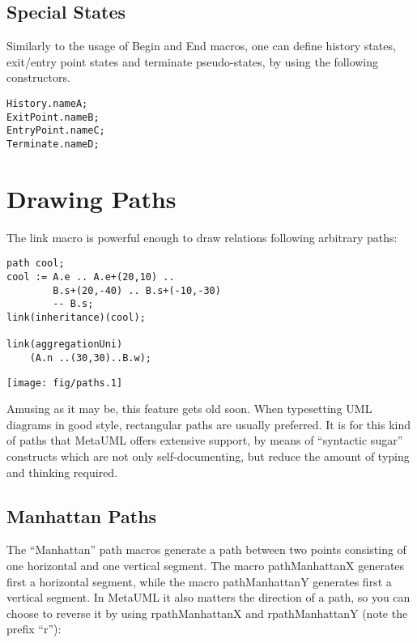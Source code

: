 \documentclass{article}
\newcommand{\code}{\ttfamily}
\begin{document}
\subsection{Special States}

Similarly to the usage of {\code Begin} and {\code End} macros, one can define history states,
exit/entry point states and terminate pseudo-states, by using the following constructors.

\begin{verbatim}
History.nameA;
ExitPoint.nameB;
EntryPoint.nameC;
Terminate.nameD;
\end{verbatim}

\section{Drawing Paths}

The {\code link} macro is powerful enough to draw relations following arbitrary paths:

\begin{multicols}{2}
\begin{verbatim}
path cool;
cool := A.e .. A.e+(20,10) ..
        B.s+(20,-40) .. B.s+(-10,-30)
        -- B.s;
link(inheritance)(cool);

link(aggregationUni)
    (A.n ..(30,30)..B.w);
\end{verbatim}
\columnbreak
\hspace{1cm}\texttt{[image: fig/paths.1]}
\end{multicols}

Amusing as it may be, this feature gets old soon. When typesetting UML diagrams in good style, rectangular paths are usually preferred. 
It is for this kind of paths that MetaUML offers extensive support, by means of ``syntactic sugar'' constructs which
are not only self-documenting, but reduce the amount of typing and thinking required.

\subsection{Manhattan Paths}

The ``Manhattan'' path macros generate a path between two points consisting of one
horizontal and one vertical segment. The macro {\code pathManhattanX} generates first a
horizontal segment, while the macro {\code pathManhattanY} generates first a
vertical segment. In MetaUML it also matters the direction of a path, so you
can choose to reverse it by using {\code rpathManhattanX} and {\code rpathManhattanY}
(note the prefix ``{\code r}''):
\end{document}
